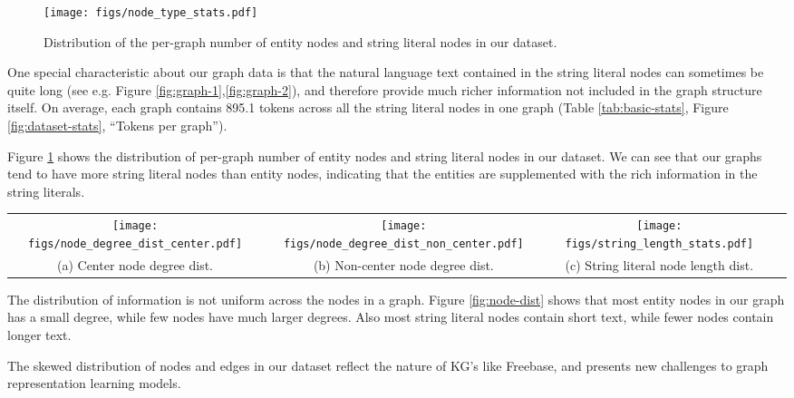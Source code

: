 \documentclass[11pt]{article}
\newcommand{\tabref}[1]{Table \ref{#1}}
\newcommand{\figref}[1]{Figure \ref{#1}}
\begin{document}
\begin{figure}[t]
    \centering
    \texttt{[image: figs/node\_type\_stats.pdf]}
    \caption{Distribution of the per-graph number of entity nodes and string literal nodes in our dataset.}
    \label{fig:node-type-stats}
\end{figure}

One special characteristic about our graph data is that the natural language text contained in the string literal nodes can sometimes be quite long (see e.g. \figref{fig:graph-1},\ref{fig:graph-2}), and therefore provide much richer information not included in the graph structure itself.  On average, each graph contains 895.1 tokens across all the string literal nodes in one graph (\tabref{tab:basic-stats}, \figref{fig:dataset-stats}, ``Tokens per graph'').


\figref{fig:node-type-stats} shows the distribution of per-graph number of entity nodes and string literal nodes in our dataset.  We can see that our graphs tend to have more string literal nodes than entity nodes, indicating that the entities are supplemented with the rich information in the string literals.

\begin{figure*}[ht]
    \centering
    \begin{tabular}{cccc}
        \texttt{[image: figs/node\_degree\_dist\_center.pdf]} &
        \texttt{[image: figs/node\_degree\_dist\_non\_center.pdf]} & 
        \texttt{[image: figs/string\_length\_stats.pdf]} \\
        (a) Center node degree dist. &
        (b) Non-center node degree dist. &
        (c) String literal node length dist.
    \end{tabular}
    \caption{Node degree distribution for entity nodes and  token count distribution for string literal nodes.}
    \label{fig:node-dist}
\end{figure*}

The distribution of information is not uniform across the nodes in a graph.  \figref{fig:node-dist} shows that most entity nodes in our graph has a small degree, while few nodes have much larger degrees.  Also most string literal nodes contain short text, while fewer nodes contain longer text.

The skewed distribution of nodes and edges in our dataset reflect the nature of KG's like Freebase, and presents new challenges to graph representation learning models.
\end{document}
